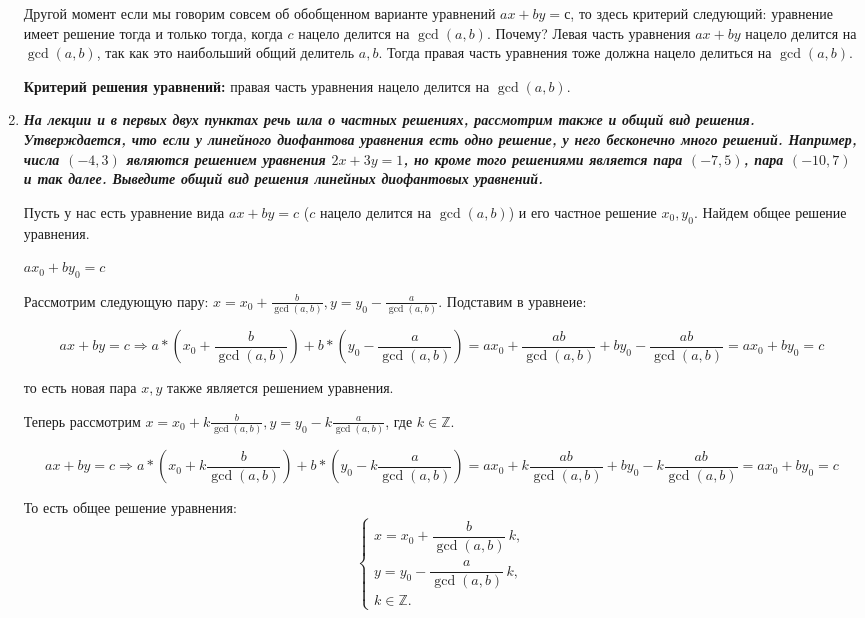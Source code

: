 \documentclass{article}
\begin{document}
\begin{enumerate}
Другой момент если мы говорим совсем об обобщенном варианте уравнений $ax + by = с$, то здесь критерий следующий: уравнение имеет решение тогда и только тогда, когда $c$ нацело делится на $\gcd(a,b)$. Почему? Левая часть уравнения $ax + by$ нацело делится на $\gcd(a,b)$, так как это наибольший общий делитель $a, b$. Тогда правая часть уравнения тоже должна нацело делиться на $\gcd(a,b)$. 

\textbf{Критерий решения уравнений:} правая часть уравнения нацело делится на $\gcd(a,b)$. 

    \item \textbf{\textit{На лекции и в первых двух пунктах речь шла о частных решениях, рассмотрим также и общий вид решения. Утверждается, что если у линейного диофантова уравнения есть одно решение, у него бесконечно много решений. Например, числа $(-4, 3)$ являются решением уравнения $2 x + 3 y = 1$, но кроме того решениями является пара $(-7, 5)$, пара $(-10, 7)$ и так далее. Выведите общий вид решения линейных диофантовых уравнений.}}

Пусть у нас есть уравнение вида $ax + by = c$ ($c$ нацело делится на $\gcd(a,b)$) и его частное решение $x_0, y_0$. Найдем общее решение уравнения.

$ax_0 + by_0 = c$

Рассмотрим следующую пару: $x = x_0 + \frac{b}{\gcd(a,b)}, y = y_0 - \frac{a}{\gcd(a,b)}$. Подставим в уравнеие:

$$ax + by = c \Rightarrow a*(x_0 + \frac{b}{\gcd(a,b)}) + b*(y_0 - \frac{a}{\gcd(a,b)}) = ax_0 + \frac{ab}{\gcd(a,b)} + by_0 - \frac{ab}{\gcd(a,b)} = ax_0 + by_0 = c$$

то есть новая пара $x, y$ также является решением уравнения.

Теперь рассмотрим  $x = x_0 + k\frac{b}{\gcd(a,b)}, y = y_0 - k\frac{a}{\gcd(a,b)}$, где $k \in \mathbb{Z}$. 

$$ax + by = c \Rightarrow a*(x_0 + k\frac{b}{\gcd(a,b)}) + b*(y_0 - k\frac{a}{\gcd(a,b)}) = ax_0 + k\frac{ab}{\gcd(a,b)} + by_0 - k\frac{ab}{\gcd(a,b)} = ax_0 + by_0 = c$$

То есть общее решение уравнения:
\[
\begin{cases}
x = x_0 + \dfrac{b}{\gcd(a,b)}\,k, \\[6pt]
y = y_0 - \dfrac{a}{\gcd(a,b)}\,k, \\[4pt]
k \in \mathbb{Z}.
\end{cases}
\]

\end{enumerate}
\end{document}
